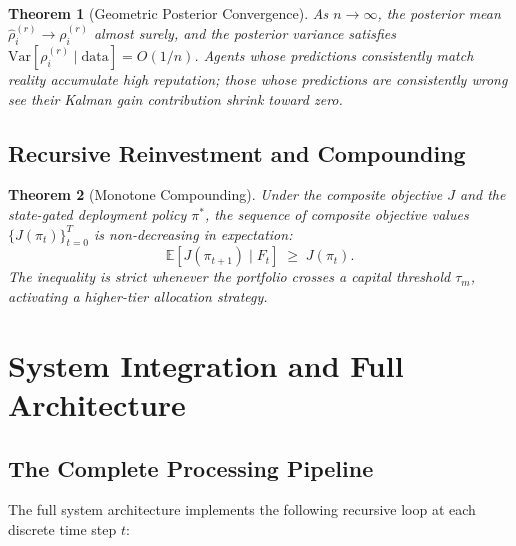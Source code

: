 \documentclass[12pt,openany]{book}
\newcommand{\E}{\mathbb{E}}
\newcommand{\calF}{\mathcal{F}}
\numberwithin{equation}{chapter}
\theoremstyle{plain}
\newtheorem{theorem}{Theorem}[chapter]
\theoremstyle{definition}
\theoremstyle{remark}
\def\mathcal#1{#1}%
\def\calF{F}%
\begin{document}
\begin{theorem}[Geometric Posterior Convergence]
\label{thm:posterior-convergence}
As $n \to \infty$, the posterior mean $\hat{\rho}_i^{(r)} \to
\rho_i^{(r)}$ almost surely, and the posterior variance satisfies
$\mathrm{Var}[\rho_i^{(r)} \mid \mathrm{data}] = O(1/n)$.
Agents whose predictions consistently match reality accumulate
high reputation; those whose predictions are consistently wrong
see their Kalman gain contribution shrink toward zero.
\end{theorem}

\section{Recursive Reinvestment and Compounding}

\begin{theorem}[Monotone Compounding]
\label{thm:monotone-compounding}
Under the composite objective $J$ and the state-gated deployment
policy $\pi^*$, the sequence of composite objective values
$\{J(\pi_t)\}_{t=0}^{T}$ is non-decreasing in expectation:
\begin{equation}
  \E\!\left[J(\pi_{t+1}) \mid \calF_t\right] \;\geq\; J(\pi_t).
\end{equation}
The inequality is strict whenever the portfolio crosses a capital
threshold $\tau_m$, activating a higher-tier allocation strategy.
\end{theorem}

\chapter{System Integration and Full Architecture}
\label{ch:integration}

\section{The Complete Processing Pipeline}

The full system architecture implements the following recursive
loop at each discrete time step $t$:
\end{document}

